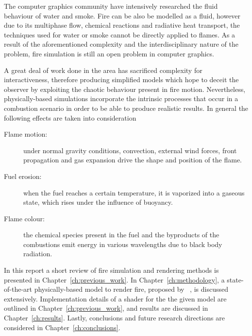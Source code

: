 The computer graphics community have intensively researched the fluid behaviour of water and smoke.
Fire can be also be modelled as a fluid, however due to its multiphase flow, chemical reactions and radiative heat transport, the techniques used for water or smoke cannot be directly applied to flames.
As a result of the aforementioned complexity and the interdisciplinary nature of the problem, fire simulation is still an open problem in computer graphics.

A great deal of work done in the area has sacrificed complexity for interactiveness, therefore producing simplified models which hope to deceit the observer by exploiting the chaotic behaviour present in fire motion.
Nevertheless, physically-based simulations incorporate the intrinsic processes that occur in a combustion scenario in order to be able to produce realistic results.
In general the following effects are taken into consideration

\begin{description}
\item[Flame motion:] under normal gravity conditions, convection, external wind forces, front propagation and gas expansion drive the shape and position of the flame. 
\item[Fuel erosion:] when the fuel reaches a certain temperature, it is vaporized into a gaseous state, which rises under the influence of buoyancy.
\item[Flame colour:] the chemical species present in the fuel and the byproducts of the combustions emit energy in various wavelengths due to black body radiation.
\end{description}

In this report a short review of fire simulation and rendering methods is presented in Chapter~\ref{ch:previous_work}.
In Chapter~\ref{ch:methodology}, a state-of-the-art physically-based model to render fire, proposed by ~\cite{Pegoraro:2006}, is discussed extensively.
Implementation details of a \MentalRay shader for the the given model are outlined in Chapter~\ref{ch:previous_work}, and results are discussed in Chapter~\ref{ch:results}.
Lastly, conclusions and future research directions are considered in Chapter~\ref{ch:conclusions}.
